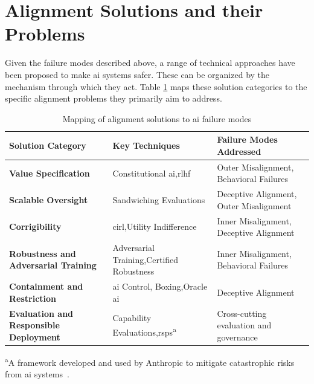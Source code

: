 \section{Alignment Solutions and their Problems}\label{sec:solutions}

	Given the failure modes described above, a range of technical approaches have been proposed to make \gls{ai} systems safer. These can be organized by the mechanism through which they act. Table \ref{tab:solutions_mapping} maps these solution categories to the specific alignment problems they primarily aim to address.

	\begin{table}[h]
		\centering
		\caption{Mapping of alignment solutions to \gls{ai} failure modes}
		\label{tab:solutions_mapping}
		
		\renewcommand{\arraystretch}{1.3}
		\small
		\begin{tabular}{@{}p{}p{}p{}@{}}
			\hline
			\textbf{Solution Category} & \textbf{Key Techniques} & \textbf{Failure Modes Addressed} \\ \hline
			\textbf{Value Specification} & Constitutional \gls{ai},\newline \gls{rlhf} & Outer Misalignment, Behavioral Failures \\ 
			\textbf{Scalable Oversight} & Sandwiching Evaluations & Deceptive Alignment, Outer Misalignment \\ 
			\textbf{Corrigibility} & \gls{cirl},\newline Utility Indifference & Inner Misalignment, Deceptive Alignment \\ 
			\textbf{Robustness and Adversarial Training} & Adversarial Training,\newline Certified Robustness & Inner Misalignment, Behavioral Failures \\ 
			\textbf{Containment and Restriction} & \gls{ai} Control, Boxing,\newline Oracle \gls{ai} & Deceptive Alignment \\ 
			\textbf{Evaluation and Responsible Deployment} & Capability Evaluations,\newline \glspl{rsp}\textsuperscript{a} & Cross-cutting evaluation and governance \\ \hline
		\end{tabular}
		
		\vspace{0.4em}
		\noindent\footnotesize\textsuperscript{a}A framework developed and used by Anthropic to mitigate catastrophic risks from \gls{ai} systems~\cite{anthropic2026rsp}.
	\end{table}

